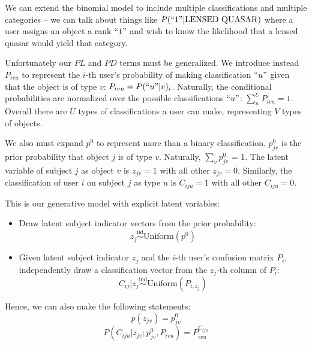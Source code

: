 \documentclass[useAMS,usenatbib,a4paper]{mn2e}
\begin{document}
We can extend the \SW binomial model to include multiple classifications and
multiple categories -- we can talk about things like $P(``1" | \rm{LENSED\
QUASAR})$ where a user assigns an object a rank $``1"$ and wish to know the
likelihood that a lensed quasar would yield that category.

Unfortunately our $PL$ and $PD$ terms must be
generalized. We introduce instead $P_{ivu}$ to represent the $i$-th user's
probability of making classification $``u"$ given that the object is of type
$v$: $P_{ivu} = P(``u" | v)_i$. Naturally, the conditional probabilities are
normalized over the possible classifications $``u"$: $\sum_u^U P_{ivu} = 1$. Overall there are $U$ types of
classifications a user can make, representing $V$ types of objects.

We also must expand $p^0$ to represent more than a binary classification.
$p_{jv}^0$ is the prior probability that object $j$ is of type $v$. Naturally,
$\sum_v p_{jv}^0$ = 1.
The latent variable of subject $j$ as object $v$ is $z_{jv} = 1$ with all
other $z_{jv} = 0$. Similarly, the classification of user $i$ on subject $j$
as type $u$ is $C_{iju} = 1$ with all other $C_{iju} = 0$.

This is our generative model with explicit latent variables:
\begin{itemize}
  \item{Draw latent subject indicator vectors from the prior probability: $$z_{j}
    \overset{\text{iid}}{\sim} \text{Uniform}\left(p^0\right)$$}
  \item{Given latent subject indicator $z_{j}$ and the $i$-th user's confusion
    matrix $P_i$, independently draw a classification vector from the $z_j$-th column
  of $P_i$: $$C_{ij} | z_{j} \overset{\text{ind}}{\sim}
\text{Uniform}\left(P_{i,z_j}\right)$$}
\end{itemize}
Hence, we can also make the following statements:
\begin{equation}
  p(z_{jv}) = p^0_{jv}
\end{equation}
\begin{equation}
  \label{eq:PCiju}
  P(C_{iju} | z_{jv}; p^0_{jv}, P_{ivu}) = P_{ivu}^{C_{iju}}
\end{equation}
\end{document}
